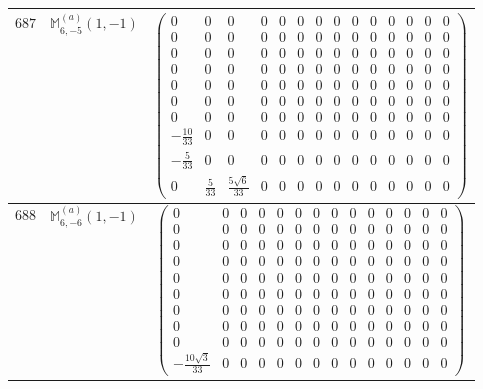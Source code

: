 \documentclass[fleqn,8pt,landscape]{jsarticle}
\begin{document}
\begin{center}
\begin{longtable}{ccc}
$ 687 $ & $ \mathbb{M}_{6,-5}^{(a)}(1,-1) $ & $ \begin{pmatrix} 0 & 0 & 0 & 0 & 0 & 0 & 0 & 0 & 0 & 0 & 0 & 0 & 0 & 0 \\ 0 & 0 & 0 & 0 & 0 & 0 & 0 & 0 & 0 & 0 & 0 & 0 & 0 & 0 \\ 0 & 0 & 0 & 0 & 0 & 0 & 0 & 0 & 0 & 0 & 0 & 0 & 0 & 0 \\ 0 & 0 & 0 & 0 & 0 & 0 & 0 & 0 & 0 & 0 & 0 & 0 & 0 & 0 \\ 0 & 0 & 0 & 0 & 0 & 0 & 0 & 0 & 0 & 0 & 0 & 0 & 0 & 0 \\ 0 & 0 & 0 & 0 & 0 & 0 & 0 & 0 & 0 & 0 & 0 & 0 & 0 & 0 \\ 0 & 0 & 0 & 0 & 0 & 0 & 0 & 0 & 0 & 0 & 0 & 0 & 0 & 0 \\ - \frac{10}{33} & 0 & 0 & 0 & 0 & 0 & 0 & 0 & 0 & 0 & 0 & 0 & 0 & 0 \\ - \frac{5}{33} & 0 & 0 & 0 & 0 & 0 & 0 & 0 & 0 & 0 & 0 & 0 & 0 & 0 \\ 0 & \frac{5}{33} & \frac{5 \sqrt{6}}{33} & 0 & 0 & 0 & 0 & 0 & 0 & 0 & 0 & 0 & 0 & 0 \end{pmatrix} $ \\ \hline
$ 688 $ & $ \mathbb{M}_{6,-6}^{(a)}(1,-1) $ & $ \begin{pmatrix} 0 & 0 & 0 & 0 & 0 & 0 & 0 & 0 & 0 & 0 & 0 & 0 & 0 & 0 \\ 0 & 0 & 0 & 0 & 0 & 0 & 0 & 0 & 0 & 0 & 0 & 0 & 0 & 0 \\ 0 & 0 & 0 & 0 & 0 & 0 & 0 & 0 & 0 & 0 & 0 & 0 & 0 & 0 \\ 0 & 0 & 0 & 0 & 0 & 0 & 0 & 0 & 0 & 0 & 0 & 0 & 0 & 0 \\ 0 & 0 & 0 & 0 & 0 & 0 & 0 & 0 & 0 & 0 & 0 & 0 & 0 & 0 \\ 0 & 0 & 0 & 0 & 0 & 0 & 0 & 0 & 0 & 0 & 0 & 0 & 0 & 0 \\ 0 & 0 & 0 & 0 & 0 & 0 & 0 & 0 & 0 & 0 & 0 & 0 & 0 & 0 \\ 0 & 0 & 0 & 0 & 0 & 0 & 0 & 0 & 0 & 0 & 0 & 0 & 0 & 0 \\ 0 & 0 & 0 & 0 & 0 & 0 & 0 & 0 & 0 & 0 & 0 & 0 & 0 & 0 \\ - \frac{10 \sqrt{3}}{33} & 0 & 0 & 0 & 0 & 0 & 0 & 0 & 0 & 0 & 0 & 0 & 0 & 0 \end{pmatrix} $ \\ \hline

\end{longtable}
\end{center}
\end{document}
